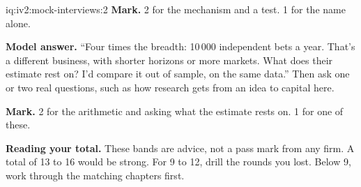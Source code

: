 \begin{solution}{iq:iv2:mock-interviews:2}
\textbf{Mark.} 2 for the mechanism and a test. 1 for the name alone.

\ivstop
\textbf{Model answer.} ``Four times the breadth: 10\,000 independent bets a year. That's a different business, with shorter horizons or more markets. What does their estimate rest on? I'd compare it out of sample, on the same data.'' Then ask one or two real questions, such as how research gets from an idea to capital here.

\textbf{Mark.} 2 for the arithmetic and asking what the estimate rests on. 1 for one of these.

\medskip
\textbf{Reading your total.} These bands are advice, not a pass mark from any firm. A total of 13 to 16 would be strong. For 9 to 12, drill the rounds you lost. Below 9, work through the matching chapters first.

\end{solution}

